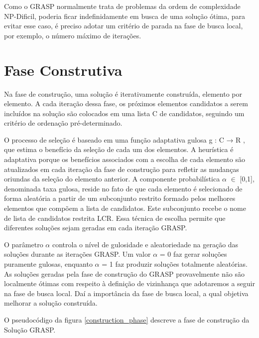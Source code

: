 Como o GRASP normalmente trata de problemas da ordem de complexidade NP-Dificil, poderia ficar indefinidamente em busca de uma solução ótima, para evitar esse caso, é preciso adotar um critério de parada na fase de busca local, por exemplo, o número máximo de iterações.

\section{Fase Construtiva}\label{teste}
Na fase de construção, uma solução é iterativamente construída, elemento por elemento. A cada iteração dessa fase, os próximos elementos candidatos a serem incluídos na solução são colocados em uma lista C de candidatos, seguindo um critério de ordenação pré-determinado. 

O processo de seleção é baseado em uma função adaptativa gulosa g : C → R , que estima o benefício da seleção de cada um dos elementos. A heurística é adaptativa porque os benefícios associados com a escolha de cada elemento são atualizados em cada iteração da fase de construção para refletir as mudanças oriundas da seleção do elemento anterior. A componente probabilística $\alpha$ $\in$ [0,1], denominada taxa gulosa, reside no fato de que cada elemento é selecionado de forma aleatória a partir de um subconjunto restrito formado pelos melhores elementos que compõem a lista de candidatos. Este subconjunto recebe o nome de lista de candidatos restrita LCR. Essa técnica de escolha permite que diferentes soluções sejam geradas em cada iteração GRASP.

O parâmetro $\alpha$ controla o nível de gulosidade e aleatoriedade na geração das soluções durante as iterações GRASP. Um valor $\alpha$ = 0 faz gerar soluções puramente gulosas, enquanto $\alpha$ = 1 faz produzir soluções totalmente aleatórias. 
As soluções geradas pela fase de construção do GRASP provavelmente não são localmente ótimas com respeito à definição de vizinhança que adotaremos a seguir na fase de busca local. Daí a importância da fase de busca local, a qual objetiva melhorar a solução construída.
	
O pseudocódigo da figura \ref{construction_phase} descreve a fase de construção da Solução GRASP.




